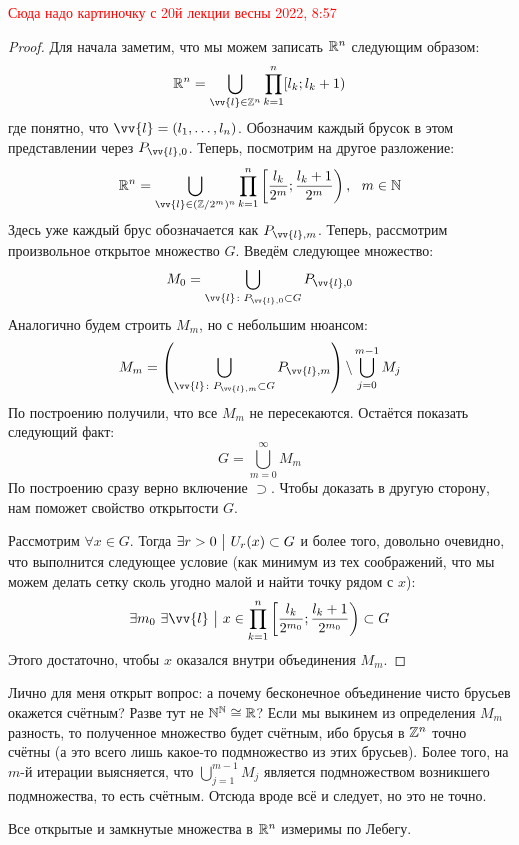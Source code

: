 \textcolor{red}{Сюда надо картиночку с 20й лекции весны 2022, 8:57}

\begin{proof}
	Для начала заметим, что мы можем записать $\mathbb{R}^n$ следующим образом:
	\[
		\R^n = \bigcup_{\vv{l} \in \Z^n} \prod_{k = 1}^n [l_k; l_k + 1)
	\]
	где понятно, что $\vv{l} = (l_1, \ldots, l_n)$. Обозначим каждый брусок в этом представлении через $P_{\vv{l}, 0}$. Теперь, посмотрим на другое разложение:
	\[
		\R^n = \bigcup_{\vv{l} \in (\Z / 2^m)^n} \prod_{k = 1}^n \left[\frac{l_k}{2^m}; \frac{l_k + 1}{2^m}\right),\ \ m \in \N
	\]
	Здесь уже каждый брус обозначается как $P_{\vv{l}, m}$. Теперь, рассмотрим произвольное открытое множество $G$. Введём следующее множество:
	\[
		M_0 = \bigcup_{\vv{l} \colon P_{\vv{l}, 0} \subset G} P_{\vv{l}, 0}
	\]
	Аналогично будем строить $M_m$, но с небольшим нюансом:
	\[
		M_m = \left(\bigcup_{\vv{l} \colon P_{\vv{l}, m} \subset G} P_{\vv{l}, m}\right) \bs \bigcup_{j = 0}^{m - 1} M_j
	\]
	По построению получили, что все $M_m$ не пересекаются. Остаётся показать следующий факт:
	\[
		G = \bigcup_{m = 0}^\infty M_m
	\]
	По построению сразу верно включение $\supset$. Чтобы доказать в другую сторону, нам поможет свойство открытости $G$. 
	
	Рассмотрим $\forall x \in G$. Тогда \(\exists r > 0 \ \big|\  U_r(x) \subset G\) и более того, довольно очевидно, что выполнится следующее условие (как минимум из тех соображений, что мы можем делать сетку сколь угодно малой и найти точку рядом с $x$):
	\[
		\exists m_0\ \exists \vv{l} \such x \in \prod_{k = 1}^n \left[\frac{l_k}{2^{m_0}}; \frac{l_k + 1}{2^{m_0}}\right) \subset G
	\]
	Этого достаточно, чтобы $x$ оказался внутри объединения $M_m$.
\end{proof}

\begin{anote}
	Лично для меня открыт вопрос: а почему бесконечное объединение чисто брусьев окажется счётным? Разве тут не $\mathbb{N}^{\mathbb{N}} \cong \mathbb{R}$? Если мы выкинем из определения $M_m$ разность, то полученное множество будет счётным, ибо брусья в $\mathbb{Z}^n$ точно счётны (а это всего лишь какое-то подмножество из этих брусьев). Более того, на $m$-й итерации выясняется, что $\bigcup_{j = 1}^{m - 1} M_j$ является подмножеством возникшего подмножества, то есть счётным. Отсюда вроде всё и следует, но это не точно.
\end{anote}

\begin{corollary}
	Все открытые и замкнутые множества в $\mathbb{R}^n$ измеримы по Лебегу.
\end{corollary}

